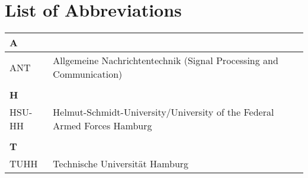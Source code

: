 \chapter*{List of Abbreviations}
\label{sec:abbreviations}
\begin{longtable}[t]{ll}
\arrayrulecolor{hsugrau}
\textbf{\textcolor{hsurot}{A}} &\\ \hline
ANT & Allgemeine Nachrichtentechnik (Signal Processing and Communication)\\

  &\\ \textbf{\textcolor{hsurot}{H}} &\\  \hline
HSU-HH & Helmut-Schmidt-University/University of the Federal Armed Forces Hamburg\\

  &\\ \textbf{\textcolor{hsurot}{T}} &\\  \hline
TUHH & Technische Universit\"at Hamburg\\

\end{longtable}